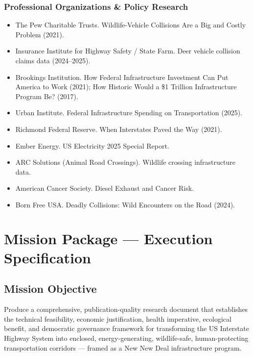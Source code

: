 \documentclass[11pt,letterpaper]{article}
\newcommand{\stageheader}[2]{%
  \noindent\colorbox{#2}{\makebox[\textwidth][l]{%
    \textcolor{white}{\bfseries\sffamily\hspace{6pt}#1\hspace{6pt}}}}%
  \vspace{0.5em}\par%
}
\begin{document}
\subsubsection{Professional Organizations \& Policy Research}
\begin{itemize}
  \item The Pew Charitable Trusts. Wildlife-Vehicle Collisions Are a Big and Costly Problem (2021).
  \item Insurance Institute for Highway Safety / State Farm. Deer vehicle collision claims data (2024--2025).
  \item Brookings Institution. How Federal Infrastructure Investment Can Put America to Work (2021); How Historic Would a \$1 Trillion Infrastructure Program Be? (2017).
  \item Urban Institute. Federal Infrastructure Spending on Transportation (2025).
  \item Richmond Federal Reserve. When Interstates Paved the Way (2021).
  \item Ember Energy. US Electricity 2025 Special Report.
  \item ARC Solutions (Animal Road Crossings). Wildlife crossing infrastructure data.
  \item American Cancer Society. Diesel Exhaust and Cancer Risk.
  \item Born Free USA. Deadly Collisions: Wild Encounters on the Road (2024).
\end{itemize}

\newpage

\stageheader{STAGE 3 --- MISSION PACKAGE}{tertiary}

\section{Mission Package --- Execution Specification}

\subsection{Mission Objective}

Produce a comprehensive, publication-quality research document that establishes the technical feasibility, economic justification, health imperative, ecological benefit, and democratic governance framework for transforming the US Interstate Highway System into enclosed, energy-generating, wildlife-safe, human-protecting transportation corridors --- framed as a New New Deal infrastructure program.
\end{document}
